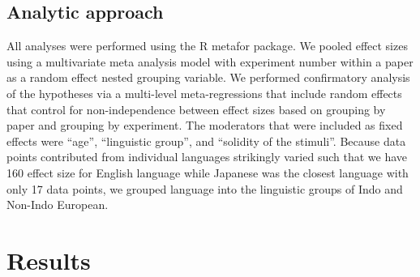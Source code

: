 \documentclass[
  man]{apa6}
\begin{document}
\hypertarget{analytic-approach}{%
\subsection{Analytic approach}\label{analytic-approach}}

All analyses were performed using the R metafor package. We pooled effect sizes using a multivariate meta analysis model with experiment number within a paper as a random effect nested grouping variable. We performed confirmatory analysis of the hypotheses via a multi-level meta-regressions that include random effects that control for non-independence between effect sizes based on grouping by paper and grouping by experiment. The moderators that were included as fixed effects were ``age'', ``linguistic group'', and ``solidity of the stimuli''. Because data points contributed from individual languages strikingly varied such that we have 160 effect size for English language while Japanese was the closest language with only 17 data points, we grouped language into the linguistic groups of Indo and Non-Indo European.

\hypertarget{results}{%
\section{Results}\label{results}}
\end{document}
